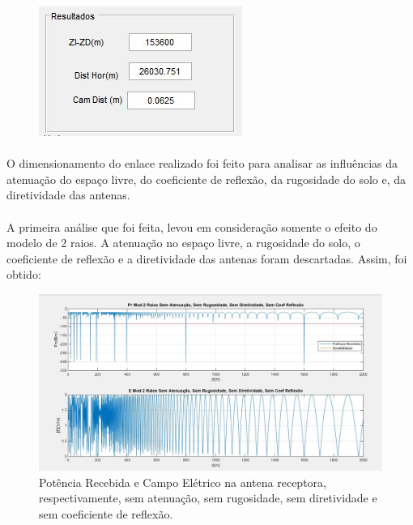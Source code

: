 \FloatBarrier
\begin{figure}[!htp]
\centering
\includegraphics[scale = 0.8]{Figuras/Parametros.JPG}
\caption{}
\end{figure}
\FloatBarrier

\paragraph{}O dimensionamento do enlace realizado foi feito para analisar as influências da atenuação do espaço livre, do coeficiente de reflexão, da rugosidade do solo e, da diretividade das antenas.

\paragraph{}A primeira análise que foi feita, levou em consideração somente o efeito do modelo de 2 raios. A atenuação no espaço livre, a rugosidade do solo, o coeficiente de reflexão e a diretividade das antenas foram descartadas. Assim, foi obtido:

\FloatBarrier
\begin{figure}[!htp]
\centering
\includegraphics[scale = 0.3]{Figuras/SA_SR_SD_SCR.JPG}
\caption{Potência Recebida e Campo Elétrico na antena receptora, respectivamente, sem atenuação, sem rugosidade, sem diretividade e sem coeficiente de reflexão.}
\end{figure}
\FloatBarrier


